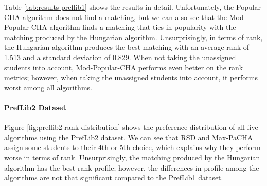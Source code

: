 \begin{table}[h!]
  \centering
  \caption{Summary of the Results for PrefLib1}
  \label{tab:results-preflib1}
\end{table}

Table \ref{tab:results-preflib1} shows the results in detail. Unfortunately, the Popular-CHA algorithm does not find a matching, but we can also see that the Mod-Popular-CHA algorithm finds a matching that ties in popularity with the matching produced by the Hungarian algorithm. Unsurprisingly, in terms of rank, the Hungarian algorithm produces the best matching with an average rank of 1.513 and a standard deviation of 0.829. When not taking the unassigned students into account, Mod-Popular-CHA performs even better on the rank metrics; however, when taking the unassigned students into account, it performs worst among all algorithms.


\paragraph{PrefLib2 Dataset}
Figure \ref{fig:preflib2-rank-distribution} shows the preference distribution of all five algorithms using the PrefLib2 dataset. We can see that RSD and Max-PaCHA assign some students to their 4th or 5th choice, which explains why they perform worse in terms of rank. Unsurprisingly, the matching produced by the Hungarian algorithm has the best rank-profile; however, the differences in profile among the algorithms are not that significant compared to the PrefLib1 dataset.

